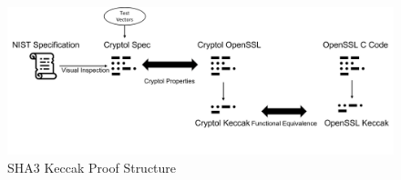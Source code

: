 
\begin{figure}[h]
  \centering
  \includegraphics[width=\linewidth]{img/proof.png}
  
  \caption{SHA3 Keccak Proof Structure}
  \label{fig:proofStructure}
  
\end{figure}
